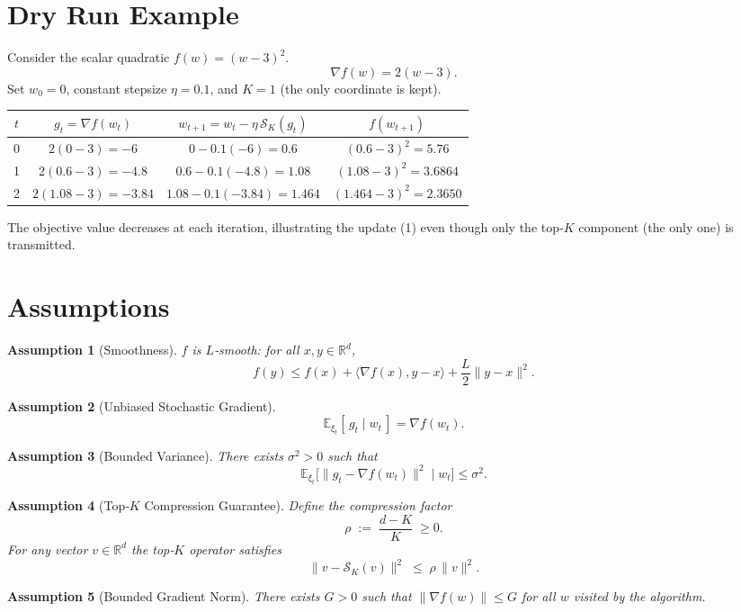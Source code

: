 \documentclass{article}
\newtheorem{assumption}{Assumption}
\newcommand{\topk}[1]{\mathcal{S}_K(#1)}
\begin{document}
\section*{Dry Run Example}
Consider the scalar quadratic $f(w)=(w-3)^2$.
\[
\nabla f(w)=2(w-3).
\]
Set $w_0=0$, constant stepsize $\eta=0.1$, and $K=1$ (the only coordinate is kept).

\begin{center}
\begin{tabular}{c|c|c|c}
$t$ & $g_t= \nabla f(w_t)$ & $w_{t+1}=w_t-\eta\,\topk{g_t}$ & $f(w_{t+1})$\\\hline
0 & $2(0-3)=-6$ & $0-0.1(-6)=0.6$ & $(0.6-3)^2=5.76$\\
1 & $2(0.6-3)=-4.8$ & $0.6-0.1(-4.8)=1.08$ & $(1.08-3)^2=3.6864$\\
2 & $2(1.08-3)=-3.84$ & $1.08-0.1(-3.84)=1.464$ & $(1.464-3)^2=2.3650$
\end{tabular}
\end{center}
The objective value decreases at each iteration, illustrating the update (1) even though only the top‑$K$ component (the only one) is transmitted.

\newpage

\section*{Assumptions}
\begin{assumption}[Smoothness]\label{as:smooth}
$f$ is $L$‑smooth: for all $x,y\in\mathbb{R}^d$,
\[
f(y)\le f(x)+\langle\nabla f(x),y-x\rangle+\frac{L}{2}\|y-x\|^2 .
\]
\end{assumption}
\begin{assumption}[Unbiased Stochastic Gradient]\label{as:unbiased}
\[
\mathbb{E}_{\xi_t}[\,g_t\mid w_t\,]=\nabla f(w_t).
\]
\end{assumption}
\begin{assumption}[Bounded Variance]\label{as:variance}
There exists $\sigma^2>0$ such that
\[
\mathbb{E}_{\xi_t}\big[\|g_t-\nabla f(w_t)\|^2\mid w_t\big]\le\sigma^2 .
\]
\end{assumption}
\begin{assumption}[Top‑$K$ Compression Guarantee]\label{as:compress}
Define the compression factor
\[
\rho\;:=\;\frac{d-K}{K}\;\ge 0 .
\]
For any vector $v\in\mathbb{R}^d$ the top‑$K$ operator satisfies
\[
\|v-\topk{v}\|^2\;\le\;\rho\,\|v\|^2 . \tag{2}
\]
\end{assumption}
\begin{assumption}[Bounded Gradient Norm]\label{as:gradbound}
There exists $G>0$ such that $\|\nabla f(w)\|\le G$ for all $w$ visited by the algorithm.
\end{assumption}
\end{document}
